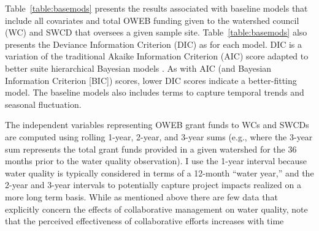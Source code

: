 \documentclass[12pt,a4paper,titlepage]{article}
\begin{document}
Table~\ref{table:basemods} presents the results associated with baseline models that include all covariates and total OWEB funding given to the watershed council (WC) and SWCD that oversees a given sample site. Table~\ref{table:basemods} also presents the Deviance Information Criterion (DIC) as for each model. DIC is a variation of the traditional Akaike Information Criterion (AIC) score adapted to better suite hierarchical Bayesian models \parencite{ward2008,spiegelhalter2002}. As with AIC (and Bayesian Information Criterion [BIC]) scores, lower DIC scores indicate a better-fitting model. The baseline models also includes terms to capture temporal trends and seasonal fluctuation.



The independent variables representing OWEB grant funds to WCs and SWCDs are computed using rolling 1-year, 2-year, and 3-year sums (e.g., where the 3-year sum represents the total grant funds provided in a given watershed for the 36 months prior to the water quality observation). I use the 1-year interval because water quality is typically considered in terms of a 12-month ``water year,'' and the 2-year and 3-year intervals to potentially capture project impacts realized on a more long term basis. While as mentioned above there are few data that explicitly concern the effects of collaborative management on water quality, \textcite[][p. 281]{lubell2009} note that the perceived effectiveness of collaborative efforts increases with time \parencite[see also][]{leach2002, leach2006}
\end{document}
